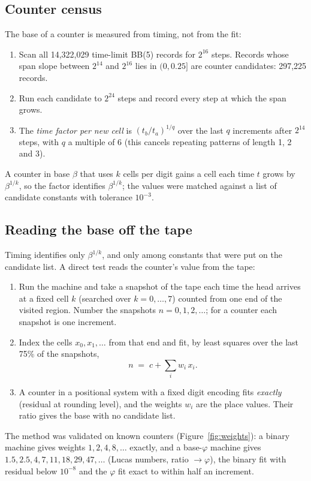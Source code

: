\documentclass[11pt,a4paper]{article}
\newcommand{\BB}[1]{BB(#1)}
\begin{document}
\subsection{Counter census}
\label{sec:countermethod}
The base of a counter is measured from timing, not from the fit:
\begin{enumerate}
\item Scan all 14,322,029 time-limit \BB{5} records for $2^{16}$ steps. Records whose span slope
between $2^{14}$ and $2^{16}$ lies in $(0, 0.25]$ are counter candidates: 297,225 records.
\item Run each candidate to $2^{24}$ steps and record every step at which the span grows.
\item The \emph{time factor per new cell} is $(t_b/t_a)^{1/q}$ over the last $q$ increments after
$2^{14}$ steps, with $q$ a multiple of 6 (this cancels repeating patterns of length 1, 2 and 3).
\end{enumerate}
A counter in base $\beta$ that uses $k$ cells per digit gains a cell each time $t$ grows by
$\beta^{1/k}$, so the factor identifies $\beta^{1/k}$; the values were matched against a list of
candidate constants with tolerance $10^{-3}$.

\subsection{Reading the base off the tape}
\label{sec:weightmethod}
Timing identifies only $\beta^{1/k}$, and only among constants that were put on the candidate
list. A direct test reads the counter's value from the tape:
\begin{enumerate}
\item Run the machine and take a snapshot of the tape each time the head arrives at a fixed
cell $k$ (searched over $k = 0,\dots,7$) counted from one end of the visited region. Number the
snapshots $n = 0, 1, 2, \dots$; for a counter each snapshot is one increment.
\item Index the cells $x_0, x_1, \dots$ from that end and fit, by least squares over the last
75\% of the snapshots,
\[ n \;=\; c + \sum_i w_i\, x_i . \]
\item A counter in a positional system with a fixed digit encoding fits \emph{exactly}
(residual at rounding level), and the weights $w_i$ are the place values. Their ratio gives
the base with no candidate list.
\end{enumerate}
The method was validated on known counters (Figure~\ref{fig:weights}): a binary machine gives
weights $1, 2, 4, 8, \dots$ exactly, and a base-$\varphi$ machine gives
$1.5, 2.5, 4, 7, 11, 18, 29, 47, \dots$ (Lucas numbers, ratio $\to\varphi$), the binary fit with residual
below $10^{-8}$ and the $\varphi$ fit exact to within half an increment.
\end{document}
